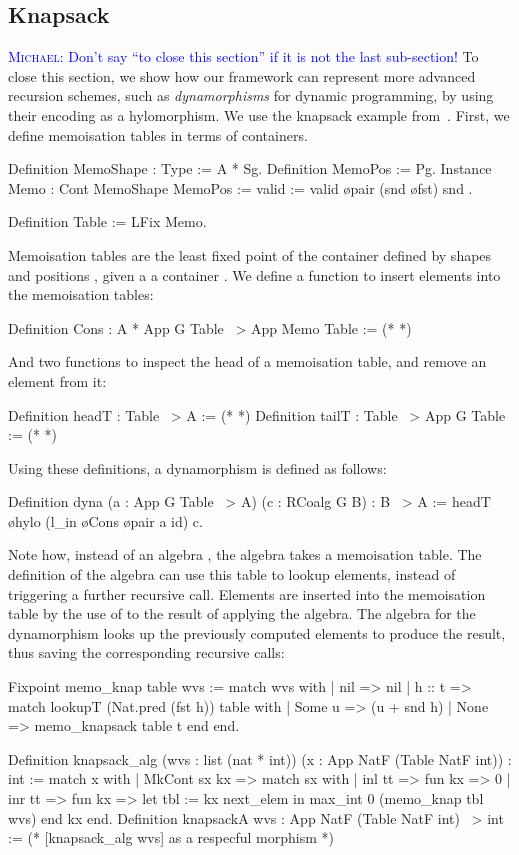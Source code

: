 \documentclass[ a4paper, UKenglish, cleveref, autoref, thm-restate]{lipics-v2021}
\newcommand{\mvol}[1]{\textcolor{blue}{\textsc{Michael}: #1}}
\begin{document}
\subsection{Knapsack}
\mvol{Don't say ``to close this section'' if it is not the last sub-section!}
To close this section, we show how our framework can represent more advanced
recursion schemes, such as \emph{dynamorphisms} for dynamic programming, by
using their encoding as a hylomorphism. We use the knapsack example
from~\cite{HinzeWG15}. First, we define memoisation tables in terms
of containers. 
\begin{coqcode}
Definition MemoShape : Type := A * Sg.
Definition MemoPos := Pg.
Instance Memo : Cont MemoShape MemoPos := { valid := valid \o pair (snd \o fst) snd }.

Definition Table := LFix Memo.
\end{coqcode}
Memoisation tables are the least fixed point of the container defined by shapes
 and positions , given a a container .
We define a function to insert elements into the memoisation tables:
\begin{coqcode}
  Definition Cons : A * App G Table ~> App Memo Table := (* *)
\end{coqcode}
And two functions to inspect the head of a memoisation table, and remove an
element from it:
\begin{coqcode}
Definition headT : Table ~> A := (* *)
Definition tailT : Table ~> App G Table := (* *)
\end{coqcode}
Using these definitions, a dynamorphism is defined as follows:
\begin{coqcode}
Definition dyna (a : App G Table ~> A) (c : RCoalg G B) : B ~> A
:= headT \o hylo (l_in \o Cons \o pair a id) c.
\end{coqcode}
Note how, instead of an algebra , the algebra takes a
memoisation table. The definition of the algebra can use this table to lookup
elements, instead of triggering a further recursive call. Elements are inserted
into the memoisation table by the use of  to the result of applying
the algebra. The algebra for the dynamorphism looks up the previously computed
elements to produce the result, thus saving the corresponding recursive calls:
\begin{coqcode}
Fixpoint memo_knap table wvs :=
  match wvs with | nil => nil | h :: t =>
      match lookupT (Nat.pred (fst h)) table with
      | Some u => (u + snd h)%
      | None => memo_knapsack table t
      end
  end.

Definition knapsack_alg (wvs : list (nat * int))
  (x : App NatF (Table NatF int)) : int :=
  match x with | MkCont sx kx => match sx with
  | inl tt => fun kx => 0%
  | inr tt => fun kx => let tbl := kx next_elem in max_int 0 (memo_knap tbl wvs)
  end kx end.
Definition knapsackA wvs : App NatF (Table NatF int) ~> int := 
  (* [knapsack_alg wvs] as a respecful morphism *)
\end{coqcode}
\end{document}
